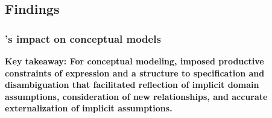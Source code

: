 \begin{comment}

\subsubsection{\evalStatisticalModels}
We used AIC, BIC, and R-squared values to assess how well statistical models
authored with vs. without rTisane fit the data. We used rTisane to statistically
model and assess the influence of rTisane on AIC, BIC, and R-squared values.

We also thematically analyzed participants' reactions to the similarities,
differences, and surprises between statistical models. 

\end{comment}

\subsection{Findings}
\subsubsection{\rTisane's impact on conceptual models}
\textbf{Key takeaway: For conceptual modeling, \rTisane imposed productive
constraints of expression and a structure to specification and disambiguation
that facilitated reflection of implicit domain assumptions, consideration of new
relationships, and accurate externalization of implicit assumptions.}

